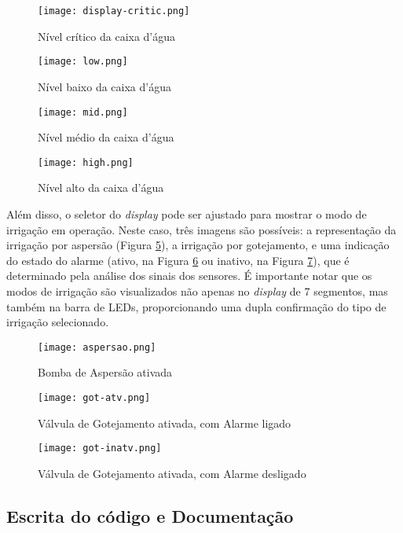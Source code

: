 \documentclass[
	article,			%
	11pt,				%
	oneside,			%
	a4paper,			%
	english,			%
	brazil,				%
	sumario=tradicional
	]{abntex2}
\begin{document}
\begin{figure}[H]
    \centering
    \texttt{[image: display-critic.png]}
    \caption{Nível crítico da caixa d'água}
    \label{fig:critic}
\end{figure}
\begin{figure}[H]
    \centering
    \texttt{[image: low.png]}
    \caption{Nível baixo da caixa d'água}
    \label{fig:low}
\end{figure}
\begin{figure}[H]
    \centering
    \texttt{[image: mid.png]}
    \caption{Nível médio da caixa d'água}
    \label{fig:mid}
\end{figure}
\begin{figure}[H]
    \centering
    \texttt{[image: high.png]}
    \caption{Nível alto da caixa d'água}
    \label{fig:high}
\end{figure}

Além disso, o seletor do \textit{display} pode ser ajustado para mostrar o modo de irrigação em operação. Neste caso, três imagens são possíveis: a representação da irrigação por aspersão (Figura \ref{fig:asp}), a irrigação por gotejamento, e uma indicação do estado do alarme (ativo, na Figura \ref{fig:got-atv} ou inativo, na Figura \ref{fig:got-inatv}), que é determinado pela análise dos sinais dos sensores. É importante notar que os modos de irrigação são visualizados não apenas no \textit{display} de 7 segmentos, mas também na barra de LEDs, proporcionando uma dupla confirmação do tipo de irrigação selecionado.

\begin{figure}[H]
    \centering
    \texttt{[image: aspersao.png]}
    \caption{Bomba de Aspersão ativada}
    \label{fig:asp}
\end{figure}
\begin{figure}[H]
    \centering
    \texttt{[image: got-atv.png]}
    \caption{Válvula de Gotejamento ativada, com Alarme ligado}
    \label{fig:got-atv}
\end{figure}
\begin{figure}[H]
    \centering
    \texttt{[image: got-inatv.png]}
    \caption{Válvula de Gotejamento ativada, com Alarme desligado}
    \label{fig:got-inatv}
\end{figure}

\subsection{Escrita do código e Documentação}
\end{document}
